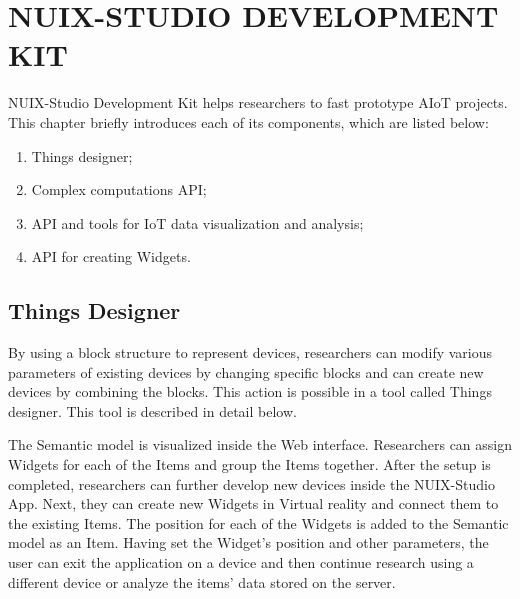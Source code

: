 
\chapter{\MakeUppercase{NUIX-Studio Development kit}}

NUIX-Studio Development Kit helps researchers to fast prototype AIoT projects. This chapter briefly introduces each of its components, which are listed below:
\begin{enumerate}
    \item Things designer;
    \item Complex computations API;
    \item API and tools for IoT data visualization and analysis;
    \item API for creating Widgets.
\end{enumerate}

\section{Things Designer}

By using a block structure to represent devices, researchers can modify various parameters of existing devices by changing specific blocks and can create new devices by combining the blocks. This action is possible in a tool called Things designer. This tool is described in detail below.

The Semantic model is visualized inside the Web interface. Researchers can assign Widgets for each of the Items and group the Items together. After the setup is completed, researchers can further develop new devices inside the NUIX-Studio App. Next, they can create new Widgets in Virtual reality and connect them to the existing Items. The position for each of the Widgets is added to the Semantic model as an Item. Having set the Widget's position and other parameters, the user can exit the application on a device and then continue research using a different device or analyze the items' data stored on the server. 

